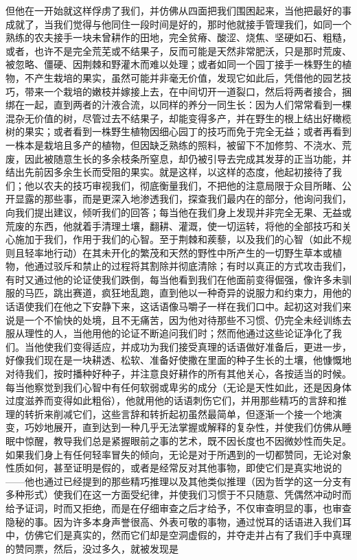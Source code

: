 但他在一开始就这样俘虏了我们，并仿佛从四面把我们围困起来，当他把最好的事成就了，当我们觉得与他同住一段时间是好的，那时他就接手管理我们，如同一个熟练的农夫接手一块未曾耕作的田地，完全贫瘠、酸涩、烧焦、坚硬如石、粗糙，或者，也许不是完全荒芜或不结果子，反而可能是天然非常肥沃，只是那时荒废、被忽略、僵硬、因荆棘和野灌木而难以处理；或者如同一个园丁接手一株野生的植物，不产生栽培的果实，虽然可能并非毫无价值，发现它如此后，凭借他的园艺技巧，带来一个栽培的嫩枝并嫁接上去，在中间切开一道裂口，然后将两者接合，捆绑在一起，直到两者的汁液合流，以同样的养分一同生长：因为人们常常看到一棵混杂无价值的树，尽管过去不结果子，却能变得多产，并在野生的根上结出好橄榄树的果实；或者看到一株野生植物因细心园丁的技巧而免于完全无益；或者再看到一株本是栽培且多产的植物，但因缺乏熟练的照料，被留下不加修剪、不浇水、荒废，因此被随意生长的多余枝条所窒息，却仍被引导去完成其发芽的正当功能，并结出先前因多余生长而受阻的果实。就是这样，以这样的态度，他起初接待了我们；他以农夫的技巧审视我们，彻底衡量我们，不把他的注意局限于众目所睹、公开显露的那些事，而是更深入地渗透我们，探查我们最内在的部分，他询问我们，向我们提出建议，倾听我们的回答；每当他在我们身上发现并非完全无果、无益或荒废的东西，他就着手清理土壤，翻耕、灌溉，使一切运转，将他的全部技巧和关心施加于我们，作用于我们的心智。至于荆棘和蒺藜，以及我们的心智（如此不规则且轻率地行动）在其未开化的繁茂和天然的野性中所产生的一切野生草本或植物，他通过驳斥和禁止的过程将其割除并彻底清除；有时以真正的方式攻击我们，有时又通过他的论证使我们跌倒，每当他看到我们在他面前变得倔强，像许多未驯服的马匹，跳出赛道，疯狂地乱跑，直到他以一种奇异的说服力和约束力，用他的话语使我们在他之下安静下来，这话语像马嚼子一样在我们口中。起初这对我们来说是一个不愉快的处境，且不无痛苦，因为他对待那些不习惯、仍完全未经训练去服从理性的人，当他用他的论证不断追问我们时；然而他通过这些论证净化了我们。当他使我们变得适应，并成功为我们接受真理的话语做好准备后，更进一步，好像我们现在是一块耕透、松软、准备好使撒在里面的种子生长的土壤，他慷慨地对待我们，按时播种好种子，并注意良好耕作的所有其他关心，各按适当的时候。每当他察觉到我们心智中有任何软弱或卑劣的成分（无论是天性如此，还是因身体过度滋养而变得如此粗俗），他就用他的话语刺伤它们，并用那些精巧的言辞和推理的转折来削减它们，这些言辞和转折起初虽然最简单，但逐渐一个接一个地演变，巧妙地展开，直到达到一种几乎无法掌握或解释的复杂性，并使我们仿佛从睡眠中惊醒，教导我们总是紧握眼前之事的艺术，既不因长度也不因微妙性而失足。如果我们身上有任何轻率冒失的倾向，无论是对于所遇到的一切都赞同，无论对象性质如何，甚至证明是假的，或者是经常反对其他事物，即使它们是真实地说的——他也通过已经提到的那些精巧推理以及其他类似推理（因为哲学的这一分支有多种形式）使我们在这一方面受纪律，并使我们习惯于不只随意、凭偶然冲动时而给予证词，时而又拒绝，而是在仔细审查之后才给予，不仅审查明显的事，也审查隐秘的事。因为许多本身声誉很高、外表可敬的事物，通过悦耳的话语进入我们耳中，仿佛它们是真实的，然而它们却是空洞虚假的，并夺走并占有了我们手中真理的赞同票，然后，没过多久，就被发现是